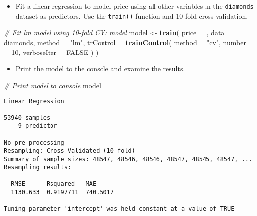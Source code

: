 \documentclass[
]{book}
\newenvironment{Shaded}{\begin{snugshade}}{\end{snugshade}}
\newcommand{\CommentTok}[1]{\textcolor[rgb]{0.56,0.35,0.01}{\textit{#1}}}
\newcommand{\DataTypeTok}[1]{\textcolor[rgb]{0.13,0.29,0.53}{#1}}
\newcommand{\DecValTok}[1]{\textcolor[rgb]{0.00,0.00,0.81}{#1}}
\newcommand{\KeywordTok}[1]{\textcolor[rgb]{0.13,0.29,0.53}{\textbf{#1}}}
\newcommand{\NormalTok}[1]{#1}
\newcommand{\OperatorTok}[1]{\textcolor[rgb]{0.81,0.36,0.00}{\textbf{#1}}}
\newcommand{\OtherTok}[1]{\textcolor[rgb]{0.56,0.35,0.01}{#1}}
\newcommand{\StringTok}[1]{\textcolor[rgb]{0.31,0.60,0.02}{#1}}
\providecommand{\tightlist}{%
  \setlength{\itemsep}{0pt}\setlength{\parskip}{0pt}}
\begin{document}
\begin{itemize}
\tightlist
\item
  Fit a linear regression to model price using all other variables in the \texttt{diamonds} dataset as predictors. Use the \texttt{train()} function and 10-fold cross-validation.
\end{itemize}

\begin{Shaded}
\begin{Highlighting}[]
\CommentTok{# Fit lm model using 10-fold CV: model}
\NormalTok{model <-}\StringTok{ }\KeywordTok{train}\NormalTok{(}
\NormalTok{  price }\OperatorTok{~}\StringTok{ }\NormalTok{., }\DataTypeTok{data =}\NormalTok{ diamonds,}
  \DataTypeTok{method =} \StringTok{"lm"}\NormalTok{,}
  \DataTypeTok{trControl =} \KeywordTok{trainControl}\NormalTok{(}
    \DataTypeTok{method =} \StringTok{"cv"}\NormalTok{, }\DataTypeTok{number =} \DecValTok{10}\NormalTok{,}
    \DataTypeTok{verboseIter =} \OtherTok{FALSE}
\NormalTok{  )}
\NormalTok{)}
\end{Highlighting}
\end{Shaded}

\begin{itemize}
\tightlist
\item
  Print the model to the console and examine the results.
\end{itemize}

\begin{Shaded}
\begin{Highlighting}[]
\CommentTok{# Print model to console}
\NormalTok{model}
\end{Highlighting}
\end{Shaded}

\begin{verbatim}
Linear Regression 

53940 samples
    9 predictor

No pre-processing
Resampling: Cross-Validated (10 fold) 
Summary of sample sizes: 48547, 48546, 48546, 48547, 48545, 48547, ... 
Resampling results:

  RMSE      Rsquared   MAE     
  1130.633  0.9197711  740.5017

Tuning parameter 'intercept' was held constant at a value of TRUE
\end{verbatim}

\begin{Shaded}
\end{Shaded}
\end{document}
